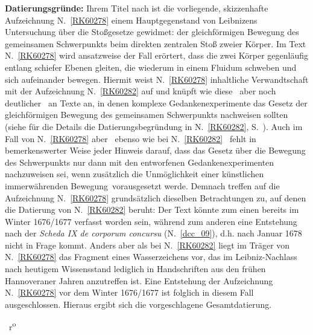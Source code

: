 \begin{ledgroup}
\footnotesize
\pstart
\noindent%
\textbf{Datierungsgründe:}
Ihrem Titel nach ist die vorliegende, skizzenhafte Aufzeichnung N.~\ref{RK60278} %
einem Hauptgegenstand von Leibnizens Untersuchung über die Stoßgesetze gewidmet: der gleichförmigen Bewegung des gemeinsamen Schwerpunkts beim direkten zentralen Stoß zweier Körper.
Im Text N.~\ref{RK60278} %
wird ansatzweise der Fall erörtert, dass die zwei Körper gegenläufig entlang schiefer Ebenen gleiten, die wiederum in einem Fluidum schweben und sich aufeinander bewegen.
Hiermit weist N.~\ref{RK60278} %
inhaltliche Verwandtschaft mit der Aufzeichnung N.~\ref{RK60282} %
auf und knüpft wie diese \textendash\ aber noch deutlicher \textendash\ an Texte an, in denen komplexe Gedankenexperimente das Gesetz der gleichförmigen Bewegung des gemeinsamen Schwerpunkts nachweisen sollten (siehe für die Details die Datierungsbegründung in N.~\ref{RK60282}, %
S.~\pageref{LH_37_05_024_Datierung}).
Auch im Fall von N.~\ref{RK60278} %
aber \textendash\ ebenso wie bei N.~\ref{RK60282} %
\textendash\ fehlt in bemerkenswerter Weise jeder Hinweis darauf, dass das Gesetz über die Bewegung des Schwerpunkts nur dann mit den entworfenen Gedankenexperimenten nachzuweisen sei, wenn zusätzlich die Unmöglichkeit einer \glqq künstlichen immerwährenden Bewegung\grqq\ vorausgesetzt werde.
Demnach treffen auf die Aufzeichnung N.~\ref{RK60278} %
grundsätzlich dieselben Betrachtungen zu, auf denen die Datierung von N.~\ref{RK60282} %
beruht: Der Text könnte zum einen bereits im Winter 1676/1677 verfasst worden sein, während zum anderen
eine Entstehung nach der \textit{Scheda IX de corporum concursu} (N.~\ref{dcc_09}), %
d.h. nach Januar 1678 nicht in Frage kommt.
Anders aber als bei N.~\ref{RK60282} %
liegt im Träger von N.~\ref{RK60278} %
das Fragment eines Wasserzeichens vor, das im Leibniz-Nachlass nach heutigem Wissensstand lediglich in Handschriften aus den frühen Hannoveraner Jahren anzutreffen ist.
Eine Entstehung der Aufzeichnung N.~\ref{RK60278} %
vor dem Winter 1676/1677 ist folglich in diesem Fall ausgeschlossen.
Hieraus ergibt sich die vorgeschlagene Gesamtdatierung.
%
\pend%
\end{ledgroup}%
%
%
%
\frenchspacing%
\count{}%
\count{}%
\count{}
\vspace{8mm}%
\pstart%
\normalsize%
\noindent%
%
~r\textsuperscript{o}\rbrack\ %
